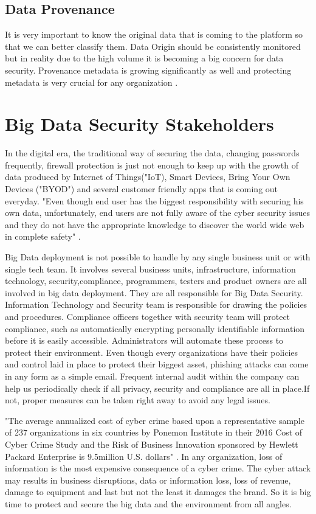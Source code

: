 \documentclass[sigconf]{acmart}
\begin{document}
\subsection{Data Provenance}
It is very important to know the original data that is coming to the platform so that we can better classify them. Data Origin should be consistently monitored but in reality due to the high volume it is becoming a big concern for data security. Provenance metadata is growing significantly as well and protecting metadata is very crucial for any organization \cite{dataconomy}.

\section{Big Data Security Stakeholders}
In the digital era, the traditional way of securing the data, changing passwords frequently, firewall protection is just not enough to keep up with the growth of data produced by Internet of Things("IoT), Smart Devices, Bring Your Own Devices ("BYOD") and several customer friendly apps that is coming out everyday. "Even though end user has the biggest responsibility with securing his own data, unfortunately, end users are not fully aware of the cyber security issues and they do not have the appropriate knowledge to discover the world wide web in complete safety"  \cite{realdolmen}.

Big Data deployment is not possible to handle by any single business unit or with single tech team. It involves several business units, infrastructure, information technology, security,compliance, programmers,
testers and product owners are all involved in big data deployment. They are all responsible for Big Data Security. Information Technology and Security team is responsible for drawing the policies and procedures. Compliance officers together with security team will protect compliance, such as automatically encrypting personally identifiable information before it is easily accessible. Administrators will automate these process to protect their environment. Even though every organizations have their policies and control laid in place to protect their biggest asset, phishing attacks can come in any form as a simple email. Frequent internal audit within the company can help us periodically check if all privacy, security and compliance are all in place.If not, proper measures can be taken right away to avoid any legal issues.

"The average annualized cost of cyber crime based upon a representative sample of 237 organizations in six countries by Ponemon Institute in their 2016 Cost of Cyber Crime Study and the Risk of Business Innovation sponsored by Hewlett Packard Enterprise is 9.5million U.S. dollars" \cite{ponemon}. In any organization, loss of information is the most expensive consequence of a cyber crime. The cyber attack may results in business disruptions, data or information loss, loss of revenue, damage to equipment and last but not the least it damages the brand. So it is big time to protect and secure the big data and the environment from all angles.
\end{document}
